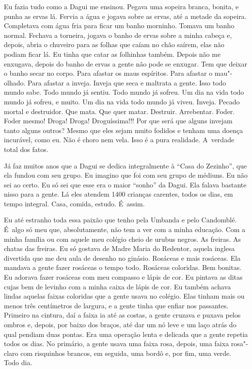 Eu fazia tudo como a Dagui me ensinou. Pegava uma sopeira branca,
bonita, e punha as ervas lá. Fervia a água e jogava sobre as ervas, até
a metade da sopeira. Completava com água fria para ficar um banho
morninho. Tomava um banho normal. Fechava a torneira, jogava o banho de
ervas sobre a minha cabeça e, depois, abria o chuveiro para as folhas
que caíam no chão saírem, elas não podiam ficar lá. Eu tinha que catar
as folhinhas também. Depois não me enxugava, depois do banho de ervas a
gente não pode se enxugar. Tem que deixar o banho secar no corpo. Para
afastar os maus espíritos. Para afastar o mau"-olhado. Para afastar a
inveja. Inveja que seca e maltrata a gente. Isso todo mundo sabe. Todo
mundo já sentiu. Todo mundo já sofreu. Um dia na vida todo mundo já
sofreu, e muito. Um dia na vida todo mundo já viveu. Inveja. Pecado
mortal e destruidor. Que mata. Que quer matar. Destruir. Arrebentar.
Foder. Foder mesmo! Droga! Droga! Droguíssima!!! Por que será que alguns
invejam tanto alguns outros? Mesmo que eles sejam muito fodidos e tenham
uma doença incurável, como eu. Não é choro nem vela. Isso é a pura
realidade. A~verdade total dos fatos.

Já faz muitos anos que a Dagui se dedica integralmente à ``Casa do
Zezinho'', que ela fundou com seu grupo. Eu imagino que foi com seu
grupo de médiuns. Eu não sei ao certo. Eu só sei que esse era o maior
``sonho'' da Dagui. Ela falava bastante nisso para a gente. Lá eles
atendem 1400 crianças carentes, todos os dias, em tempo integral. Casa,
comida, estudo. É~assim.

Eu até estranho toda essa paixão que tenho pela Umbanda e pelo
Candomblé. É~algo só meu que, absolutamente, não tem a ver com a minha
educação. Com a minha família ou com aquele meu colégio cheio de urubus
negros. As freiras. As chatas das freiras. Eu só gostava de Madre Maria
do Redentor, aquela inglesa divertida que me deu aula de desenho no
ginásio. Rosáceas e mais rosáceas. Ela mandava a gente fazer rosáceas o
tempo todo. Rosáceas coloridas. Bem bonitas. Eu adorava fazer rosáceas
com meu compasso e lápis de cor. Eu pintava as ditas cujas bem de
levinho com a minha caixa de lápis de cor. Eu também achava lindas
aquelas faixas coloridas que a gente usava no colégio. Elas tinham mais
ou menos três centímetros de largura, e a gente tinha que enfiar nos
passantes. Primeiro na cintura, daí a faixa ia até as costas, a gente
cruzava e puxava pelos ombros e, depois, por baixo dos braços, até dar
um nó leve e um laço atrás do qual pendiam duas pontas. Era uma operação
lenta e delicada que a gente repetia todos os dias. No primário, a gente
usava uma faixa rosa, depois, uma faixa rosa"-claro com risquinhos
brancos, em seguida, uma bordô e, por fim, uma verde. Todo dia.

